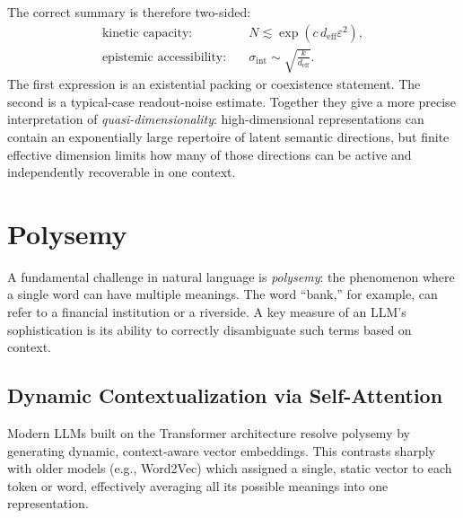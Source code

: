 \documentclass[%
  reprint,
  superscriptaddress,
  showpacs,
  showkeys,
  amsmath,amssymb,
  pra,
  longbibliography,
  floatfix,
  x11names
]{revtex4-2}
\begin{document}
The correct summary is therefore two-sided:
\begin{align}
  \text{kinetic capacity:}\quad
  &N \lesssim \exp(c\,d_{\mathrm{eff}}\varepsilon^2),
\nonumber
  \\
  \text{epistemic accessibility:}\quad
  &\sigma_{\mathrm{int}}\sim \sqrt{\frac{k}{d_{\mathrm{eff}}}} .
\nonumber
\end{align}
The first expression is an existential packing or coexistence statement. The second is a typical-case readout-noise estimate. Together they give a more precise interpretation of \emph{quasi-dimensionality}: high-dimensional representations can contain an exponentially large repertoire of latent semantic directions, but finite effective dimension limits how many of those directions can be active and independently recoverable in one context.

\section{Polysemy}
\label{section:Polysemy}

A fundamental challenge in natural language is \textit{polysemy}: the phenomenon where a single word can have multiple meanings. The word ``bank,'' for example, can refer to a financial institution or a riverside. A key measure of an LLM's sophistication is its ability to correctly disambiguate such terms based on context.

\subsection{Dynamic Contextualization via Self-Attention}

Modern LLMs built on the Transformer architecture resolve polysemy by generating dynamic,
context-aware vector embeddings.
This contrasts sharply with older models (e.g., Word2Vec) which assigned a single, static vector to each token or word, effectively averaging all its possible meanings into one representation.
\end{document}
